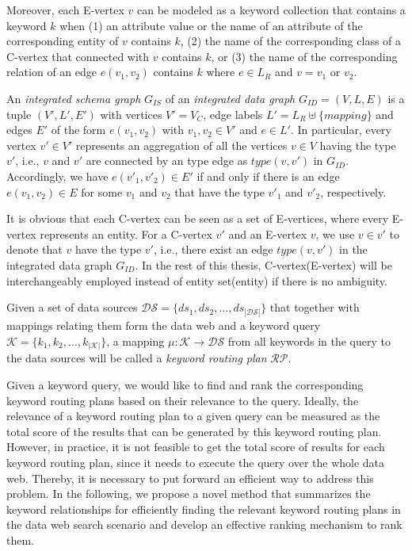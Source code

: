 Moreover, each E-vertex $v$ can be modeled as a keyword collection that contains a keyword $k$ when
(1) an attribute value or the name of an attribute of the corresponding entity of $v$ contains $k$,
(2) the name of the corresponding class of a C-vertex that connected with $v$ contains $k$, or
(3) the name of the corresponding relation of an edge $e(v_1,v_2)$ contains $k$ where $e \in L_R$
and $v = v_1$ or $v_2$.  

\begin{definition} An \emph{integrated schema graph} $G_{IS}$ of an
\emph{integrated data graph} $G_{ID} = (V,L,E)$ is a tuple $(V',L',E')$ with vertices $V' = V_C$,
edge labels $L' = L_R \uplus \{mapping\}$ and edges $E'$ of the form $e(v_1,v_2)$ with $v_1, v_2 \in
V'$ and $e \in L'$. In particular, every vertex $v' \in V'$ represents an aggregation of all the
vertices $v \in V$ having the type $v'$, i.e., $v$ and $v'$ are connected by an type edge as
$type(v,v')$ in $G_{ID}$. Accordingly, we have $e(v'_1,v'_2)\in E'$ if and only if there is an edge
$e(v_1,v_2)\in E$ for some $v_1$ and $v_2$ that have the type $v'_1$ and $v'_2$, respectively.
\end{definition}

It is obvious that each C-vertex can be seen as a set of E-vertices, where every E-vertex represents
an entity. For a C-vertex $v'$ and an E-vertex $v$, we use $v \in v'$ to denote that $v$ have the
type $v'$, i.e., there exist an edge $type(v,v')$ in the integrated data graph $G_{ID}$. In the rest
of this thesis, C-vertex(E-vertex) will be interchangeably employed instead of entity set(entity) if
there is no ambiguity.

\begin{definition} Given a set of data sources $\mathcal{DS} =
\{ds_1,ds_2,\ldots,ds_{\left\vert\mathcal{DS}\right\vert}\}$ that together with mappings relating
them form the data web and a keyword query $\mathcal{K} =
\{k_1,k_2,\ldots,k_{\left\vert\mathcal{K}\right\vert}\}$, a mapping $\mu: \mathcal{K} \to
\mathcal{DS}$ from all keywords in the query to the data sources will be called a \emph{keyword
routing plan} $\mathcal{RP}$.
\end{definition}

Given a keyword query, we would like to find and rank the corresponding keyword routing plans based
on their relevance to the query. Ideally, the relevance of a keyword routing plan to a given query
can be measured as the total score of the results that can be generated by this keyword routing plan.
However, in practice, it is not feasible to get the total score of results for each keyword routing
plan, since it needs to execute the query over the whole data web. Thereby, it is necessary to put
forward an efficient way to address this problem. In the following, we propose a novel method that
summarizes the keyword relationships for efficiently finding the relevant keyword routing plans in
the data web search scenario and develop an effective ranking mechanism to rank them.

